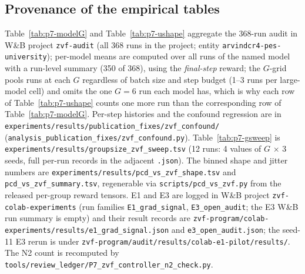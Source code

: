 \subsection{Provenance of the empirical tables}
\label{sec:p7-appendix-provenance}
Table~\ref{tab:p7-modelG} and Table~\ref{tab:p7-ushape} aggregate the
368-run audit in W\&B project \texttt{zvf-audit} (all 368 runs in the project;
entity \texttt{arvindcr4-pes-university}); per-model means are computed over all
runs of the named model with a run-level summary (350 of 368), using the
\emph{final-step} reward; the $G$-grid pools runs at each $G$ regardless of
batch size and step budget (1--3 runs per large-model cell) and omits the one
$G{=}6$ run each model has, which is why each row of
Table~\ref{tab:p7-ushape} counts one more run than the corresponding row of
Table~\ref{tab:p7-modelG}. Per-step
histories and the confound regression are in
\texttt{experiments/results/publication\_fixes/zvf\_confound/}
(\texttt{analysis\_publication\_fixes/zvf\_confound.py}). Table~\ref{tab:p7-gsweep} is
\texttt{experiments/results/groupsize\_zvf\_sweep.tsv} (12 runs: 4 values
of $G$ $\times$ 3 seeds, full per-run records in the adjacent
\texttt{.json}). The binned
shape and jitter numbers are
\texttt{experiments/results/pcd\_vs\_zvf\_shape.tsv} and
\texttt{pcd\_vs\_zvf\_summary.tsv}, regenerable via
\texttt{scripts/pcd\_vs\_zvf.py} from the released per-group reward
tensors. E1 and E3 are logged in W\&B project \texttt{zvf-colab-experiments}
(run families \texttt{E1\_grad\_signal}, \texttt{E3\_open\_audit}; the E3 W\&B
run summary is empty) and their result records are
\texttt{zvf-program/colab-experiments/results/e1\_grad\_signal.json} and
\texttt{e3\_open\_audit.json}; the seed-11 E3 rerun is under
\texttt{zvf-program/audit/results/colab-e1-pilot/results/}. The N2 count is
recomputed by \texttt{tools/review\_ledger/P7\_zvf\_controller\_n2\_check.py}.

